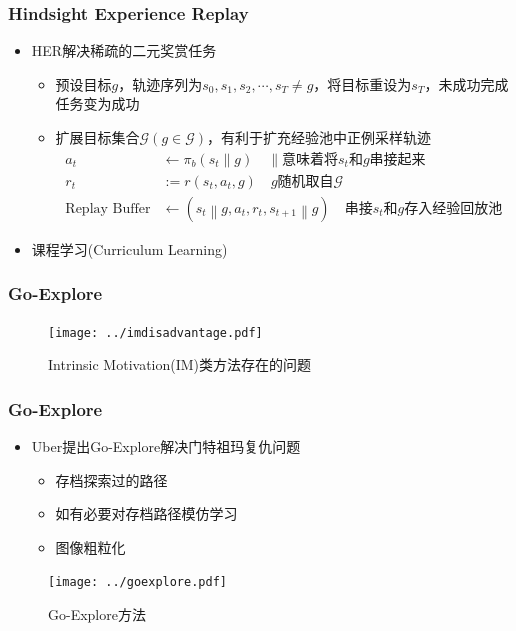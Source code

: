 \documentclass{beamer}
\begin{document}
\begin{CJK*}{GBK}{hei}
\begin{frame}\frametitle{Hindsight Experience Replay}
\begin{itemize}
\item HER\citep{Andrychowicz2017HindsightER}解决稀疏的二元奖赏任务
{
\begin{itemize}
\item 预设目标$g$，轨迹序列为$s_{0}, s_{1}, s_{2}, \cdots, s_{T}\neq g$，将目标重设为$s_T$，未成功完成任务变为成功
\item 扩展目标集合$\mathcal{G}(g \in \mathcal{G})$，有利于扩充经验池中正例采样轨迹
\begin{align*}
            a_{t} &\leftarrow \pi_{b}\left(s_{t} \| g\right)\quad \scriptstyle{\| \text{意味着将}s_t\text{和}g\text{串接起来}}\\
            r_{t}&:=r\left(s_{t}, a_{t}, g\right) \quad \scriptstyle{g \text{随机取自} \mathcal{G}}\\
            \text{Replay Buffer} &\leftarrow \left(s_{t}\left\|g, a_{t}, r_{t}, s_{t+1}\right\| g\right) \quad \scriptstyle{\text{串接}s_t\text{和}g\text{存入经验回放池}}
\end{align*}
\end{itemize}
}
\item 课程学习(Curriculum Learning)\citep{Bengio2009Curriculum}
\end{itemize}
\end{frame}

\begin{frame}\frametitle{Go-Explore}
\begin{figure}[htbp]
            \centering\texttt{[image: ../imdisadvantage.pdf]}
	    \caption{Intrinsic Motivation(IM)类方法存在的问题}
\end{figure}
\end{frame}

\begin{frame}\frametitle{Go-Explore}
\begin{itemize}
\item Uber提出Go-Explore解决门特祖玛复仇问题
{
\begin{itemize}
\item 存档探索过的路径
\item 如有必要对存档路径模仿学习
\item 图像粗粒化
\end{itemize}
}
\end{itemize}
\begin{figure}[htbp]
    \centering\texttt{[image: ../goexplore.pdf]}
    \caption{Go-Explore方法\citep{Ecoffet2019GoExploreAN}}
\end{figure}
\end{frame}


\end{CJK*}
\end{document}
